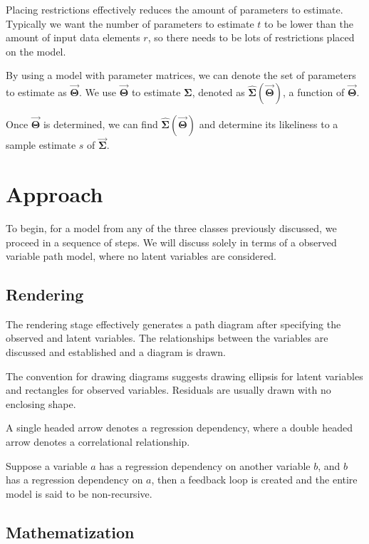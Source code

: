 \documentclass{article}
\begin{document}
\begin{multicols*}{2}
Placing restrictions effectively reduces the amount of parameters to estimate. Typically we want the number of parameters to estimate $t$ to be lower than the amount of input data elements $r$, so there needs to be lots of restrictions placed on the model.

By using a model with parameter matrices, we can denote the set of parameters to estimate as $\mathbf{\vec{\Theta}}$. We use $\mathbf{\vec{\Theta}}$ to estimate $\mathbf{\Sigma}$, denoted as $\mathbf{\hat{\Sigma}}(\mathbf{\vec{\Theta}})$, a function of $\mathbf{\vec{\Theta}}$. 

Once $\mathbf{\vec{\Theta}}$ is determined, we can find $\mathbf{\hat{\Sigma}}(\mathbf{\vec{\Theta}})$ and determine its likeliness to a sample estimate $s$ of $\mathbf{\vec{\Sigma}}$.

\section{Approach}

To begin, for a model from any of the three classes previously discussed, we proceed in a sequence of steps. We will discuss solely in terms of a observed variable path model, where no latent variables are considered.

\subsection{Rendering}

The rendering stage effectively generates a path diagram after specifying the observed and latent variables. The relationships between the variables are discussed and established and a diagram is drawn. 

The convention for drawing diagrams suggests drawing ellipsis for latent variables and rectangles for observed variables. Residuals are usually drawn with no enclosing shape.


A single headed arrow denotes a regression dependency, where a double headed arrow denotes a correlational relationship.

Suppose a variable $a$ has a regression dependency on another variable $b$, and $b$ has a regression dependency on $a$, then a feedback loop is created and the entire model is said to be non-recursive.

\subsection{Mathematization}


\end{multicols*}
\end{document}
